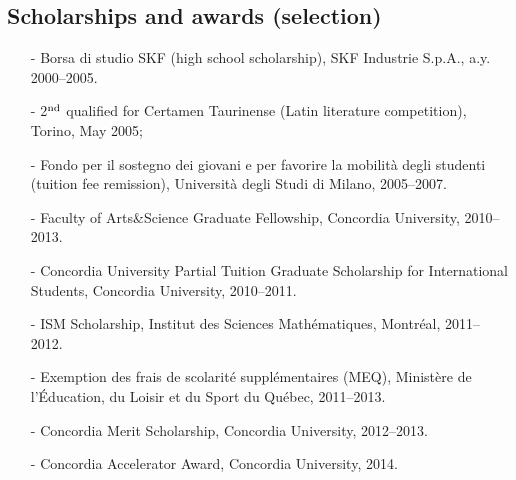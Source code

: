 \documentclass[margin]{res}
\begin{document}
\begin{resume}
 \section{Scholarships and awards (selection)}
 \begin{itemize} \itemsep -2pt  %
\item[-] Borsa di studio SKF (high school scholarship), SKF Industrie S.p.A., a.y. 2000--2005.
 \item[-] 2$^{\rm nd}$ qualified for Certamen Taurinense  (Latin literature competition), Torino, May 2005;
\item[-] Fondo per il sostegno dei giovani e per favorire la mobilit\`a degli studenti (tuition fee remission), Universit\`a degli Studi di Milano, 2005--2007.
\item[-] Faculty of Arts\&Science Graduate Fellowship, Concordia University, 2010--2013.
\item[-] Concordia University Partial Tuition Graduate Scholarship for International Students, Concordia University, 2010--2011.
\item[-] ISM Scholarship, Institut des Sciences Math\'ematiques, Montr\'eal, 2011--2012.
\item[-] Exemption des frais de scolarit\'e suppl\'ementaires (MEQ), Minist\`ere de l'\'Education, du Loisir et du Sport du Qu\'ebec, 2011--2013.
\item[-] Concordia Merit Scholarship, Concordia University, 2012--2013.
\item[-] Concordia Accelerator Award, Concordia University, 2014. \\
 \end{itemize}
 
 

\end{resume}
\end{document}
